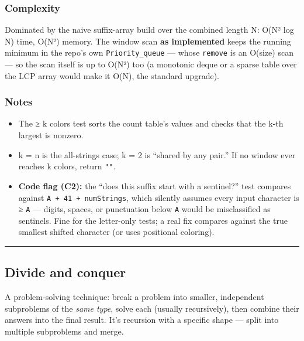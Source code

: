 \documentclass[
  10pt,
  letterpaper,
  onecolumn]{article}
\providecommand{\tightlist}{%
  \setlength{\itemsep}{0pt}\setlength{\parskip}{0pt}}
\begin{document}
\hypertarget{complexity-2}{%
\subsubsection{Complexity}\label{complexity-2}}

Dominated by the naive suffix-array build over the combined length N:
O(N² log N) time, O(N²) memory. The window scan \textbf{as implemented}
keeps the running minimum in the repo's own \texttt{Priority\_queue} ---
whose \texttt{remove} is an O(size) scan --- so the scan itself is up to
O(N²) too (a monotonic deque or a sparse table over the LCP array would
make it O(N), the standard upgrade).

\hypertarget{notes-2}{%
\subsubsection{Notes}\label{notes-2}}

\begin{itemize}
\tightlist
\item
  The ≥ k colors test sorts the count table's values and checks that the
  k-th largest is nonzero.
\item
  k = n is the all-strings case; k = 2 is ``shared by any pair.'' If no
  window ever reaches k colors, return \texttt{""}.
\item
  \textbf{Code flag (C2):} the ``does this suffix start with a
  sentinel?'' test compares against
  \texttt{\textquotesingle{}A\textquotesingle{}\ +\ 41\ +\ numStrings},
  which silently assumes every input character is ≥
  \texttt{\textquotesingle{}A\textquotesingle{}} --- digits, spaces, or
  punctuation below \texttt{\textquotesingle{}A\textquotesingle{}} would
  be misclassified as sentinels. Fine for the letter-only tests; a real
  fix compares against the true smallest shifted character (or uses
  positional coloring).
\end{itemize}

\begin{center}\rule{0.5\linewidth}{0.5pt}\end{center}

\hypertarget{divide-and-conquer}{%
\subsection{Divide and conquer}\label{divide-and-conquer}}

A problem-solving technique: break a problem into smaller, independent
subproblems of the \emph{same type}, solve each (usually recursively),
then combine their answers into the final result. It's recursion with a
specific shape --- split into multiple subproblems and merge.
\end{document}
